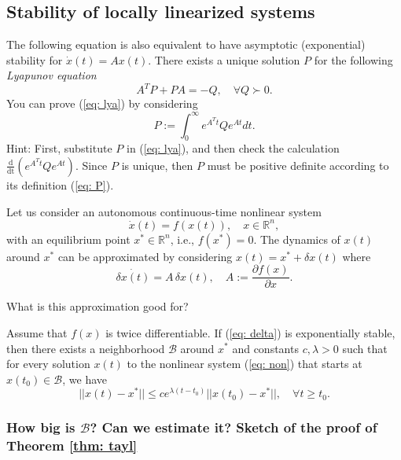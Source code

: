 \subsection{Stability of locally linearized systems}
The following equation is also equivalent to have asymptotic (exponential) stability for $\dot x(t) = Ax(t)$. There exists a unique solution $P$ for the following \emph{Lyapunov equation}
\begin{equation}
A^TP + PA = -Q, \quad \forall Q \succ 0.
	\label{eq: lya}
\end{equation}
You can prove (\ref{eq: lya}) by considering
\begin{equation}
	P:= \int_0^\infty e^{A^Tt}Qe^{At}dt.
	\label{eq: P}
\end{equation}
Hint: First, substitute $P$ in (\ref{eq: lya}), and then check the calculation $\frac{\mathrm{d}}{\mathrm{dt}}\left(e^{A^Tt}Qe^{At}\right)$. Since $P$ is unique, then $P$ must be positive definite according to its definition (\ref{eq: P}).

Let us consider an autonomous continuous-time nonlinear system
\begin{equation}
	\dot x(t) = f(x(t)), \quad x\in\mathbb{R}^n,
	\label{eq: non}
\end{equation}
with an equilibrium point $x^*\in\mathbb{R}^n$, i.e., $f(x^*) = 0$. The dynamics of $x(t)$ around $x^*$ can be approximated by considering $x(t) = x^* + \delta x(t)$ where
\begin{equation}
	\dot{\delta x(t)} = A\,\delta x(t), \quad A:=\frac{\partial f(x)}{\partial x}.
	\label{eq: delta}
\end{equation}

What is this approximation good for?

\begin{theorem}
	\label{thm: tayl}
	Assume that $f(x)$ is twice differentiable. If (\ref{eq: delta}) is exponentially stable, then there exists a neighborhood $\mathcal{B}$ around $x^*$ and constants $c, \lambda > 0$ such that for every solution $x(t)$ to the nonlinear system (\ref{eq: non}) that starts at $x(t_0)\in\mathcal{B}$, we have
	\begin{equation}
	||x(t) - x^*|| \leq ce^{\lambda(t-t_0)} ||x(t_0) - x^*||, \quad \forall t\geq t_0.
	\end{equation}
\end{theorem}

\subsubsection{How big is $\mathcal{B}$? Can we estimate it? Sketch of the proof of Theorem \ref{thm: tayl}}

